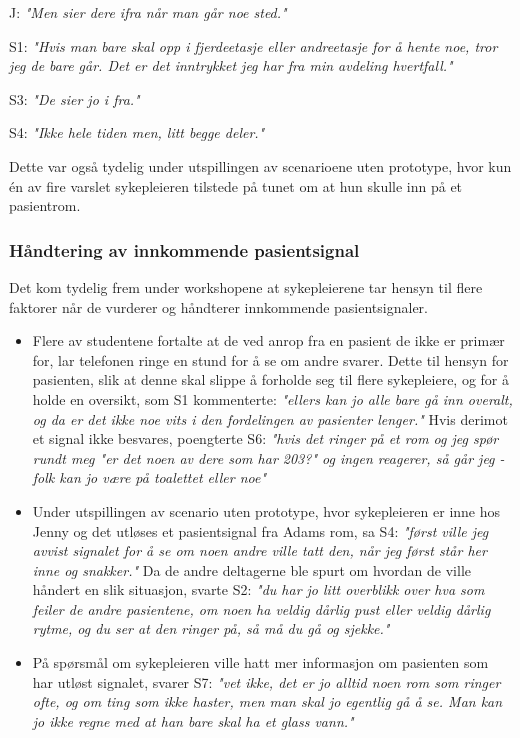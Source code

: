 \noindent
J: \emph{"Men sier dere ifra når man går noe sted."}

\noindent
S1: \emph{"Hvis man bare skal opp i fjerdeetasje eller andreetasje for å hente noe, tror jeg de bare går. Det er det inntrykket jeg har fra min avdeling hvertfall."} 

\noindent
S3: \emph{"De sier jo i fra."}

\noindent
S4: \emph{"Ikke hele tiden men, litt begge deler."}

\noindent
Dette var også tydelig under utspillingen av scenarioene uten prototype, hvor kun én av fire varslet sykepleieren tilstede på tunet om at hun skulle inn på et pasientrom. 

\subsubsection{Håndtering av innkommende pasientsignal}
Det kom tydelig frem under workshopene at sykepleierene tar hensyn til flere faktorer når de vurderer og håndterer innkommende pasientsignaler. 
\begin{itemize}
\item Flere av studentene fortalte at de ved anrop fra en pasient de ikke er primær for, lar telefonen ringe en stund for å se om andre svarer. Dette til hensyn for pasienten, slik at denne skal slippe å forholde seg til flere sykepleiere, og for å holde en oversikt, som S1 kommenterte: \emph{"ellers kan jo alle bare gå inn overalt, og da er det ikke noe vits i den fordelingen av pasienter lenger."} Hvis derimot et signal ikke besvares, poengterte S6: \emph{"hvis det ringer på et rom og jeg spør rundt meg "er det noen av dere som har 203?" og ingen reagerer, så går jeg - folk kan jo være på toalettet eller noe"}  
\item Under utspillingen av scenario uten prototype, hvor sykepleieren er inne hos Jenny og det utløses et pasientsignal fra Adams rom, sa S4: \emph{"først ville jeg avvist signalet for å se om noen andre ville tatt den, når jeg først står her inne og snakker."} Da de andre deltagerne ble spurt om hvordan de ville håndert en slik situasjon, svarte S2: \emph{"du har jo litt overblikk over hva som feiler de andre pasientene, om noen ha veldig dårlig pust eller veldig dårlig rytme, og du ser at den ringer på, så må du gå og sjekke."}  
\item På spørsmål om sykepleieren ville hatt mer informasjon om pasienten som har utløst signalet, svarer S7: \emph{"vet ikke, det er jo alltid noen rom som ringer ofte, og om ting som ikke haster, men man skal jo egentlig gå å se. Man kan jo ikke regne med at han bare skal ha et glass vann."}
\end{itemize}


